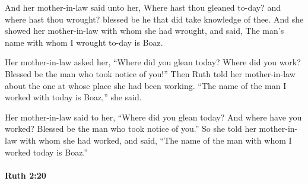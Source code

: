 			\begin{versebox}
					\item[BHS] 
					\item[LXX] 
					\item[ASV] And her mother-in-law said unto her, Where hast thou gleaned to-day? and where hast thou wrought? blessed be he that did take knowledge of thee. And she showed her mother-in-law with whom she had wrought, and said, The man's name with whom I wrought to-day is Boaz.
					\item[NIV] Her mother-in-law asked her, “Where did you glean today? Where did you work? Blessed be the man who took notice of you!” Then Ruth told her mother-in-law about the one at whose place she had been working. “The name of the man I worked with today is Boaz,” she said.
					\item[NRSV] Her mother-in-law said to her, “Where did you glean today? And where have you worked? Blessed be the man who took notice of you.” So she told her mother-in-law with whom she had worked, and said, “The name of the man with whom I worked today is Boaz.”
			\end{versebox}

		\paragraph{Ruth 2:20} %
			\label{RUTH-2-20}

